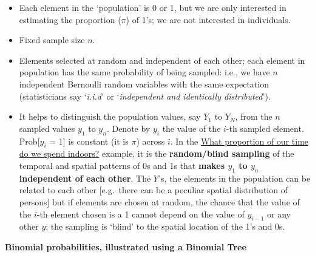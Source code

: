 \documentclass[]{book}
\begin{document}
\begin{itemize}
\item
  Each element in the `population' is 0 or 1, but we are only interested in estimating the proportion (\(\pi\)) of 1's; we are not interested in individuals.
\item
  Fixed sample size \(n\).
\item
  Elements selected at random and independent of each other; each element in population has the same probability of being sampled: i.e., we have \(n\) independent Bernoulli random variables with the same expectation (statisticians say `\emph{i.i.d}' or `\emph{independent and identically distributed}').
\item
  It helps to distinguish the population values, say \(Y_1\) to \(Y_N\), from the \(n\) sampled values \(y_1\) to \(y_n\).
  Denote by \(y_i\) the value of the \(i\)-th sampled element. Prob{[}\(y_i\) = 1{]} is constant (it is \(\pi\)) across \(i\).
  In the \href{http://www.medicine.mcgill.ca/epidemiology/hanley/bios601/Mean-Quantile/inside_outside.pdf}{What proportion of our time do we spend indoors?} example, it is the \textbf{random/blind sampling} of the temporal and spatial patterns of 0s and 1s that \textbf{makes \(y_1\) to \(y_n\) independent of each other}. The \(Y\)'s, the elements in the population can be related to each other {[}e.g.~there can be a peculiar spatial distribution of persons{]} but if elements are chosen at random, the chance that the value of the \(i\)-th element chosen is a 1 cannot depend on the value of \(y_{i−1}\) or any other \(y\): the sampling is `blind' to the spatial location of the 1's and 0s.
\end{itemize}

\textbf{Binomial probabilities, illustrated using a Binomial Tree}
\end{document}
